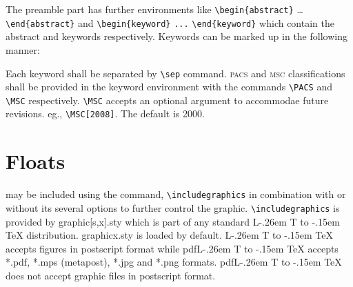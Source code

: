 \documentclass[a4paper,12pt]{article}
\makeatletter
\def\file#1{\textsf{#1}\xspace}
\def\LastPage{19}
\DeclareRobustCommand{\LaTeX}{L\kern-.26em%
        {\sbox\z@ T%
         \vbox to\ht\z@{\hbox{\check@mathfonts
           \fontsize\sf@size\z@
           \math@fontsfalse\selectfont
          A\,}%
         \vss}%
        }%
     \kern-.15em%
    \TeX}
\makeatother
\begin{document}
\begin{vquote}
\end{vquote}

The preamble part has further environments like
\verb+\begin{abstract}+ \dots \linebreak \verb+\end{abstract}+ and
\verb+\begin{keyword}+ \verb+...+ \verb+\end{keyword}+ which
contain the abstract and keywords respectively. Keywords can be
marked up in the following manner:


\noindent Each keyword shall be separated by \verb+\sep+ command.
\textsc{pacs} and \textsc{msc} classifications shall be provided in
the keyword environment with the commands \verb+\PACS+ and
\verb+\MSC+ respectively.  \verb+\MSC+ accepts an optional
argument to accommodae future revisions.
eg., \verb=\MSC[2008]=. The default is 2000.

\npskip=0mm
\pinclude{\copy\contbox\printSq{\LastPage}}

\newpage

\section{Floats}
\hypertarget{floats}{}
 may be included using the command,
\verb+\includegraphics+ in combination with or without its
several options to further control the graphic.
\verb+\includegraphics+ is provided by \file{graphic[s,x].sty}
which is part of any standard \LaTeX{} distribution.
\file{graphicx.sty} is loaded by default. \LaTeX{} accepts
figures in postscript format while pdf\LaTeX{} accepts
\file{*.pdf}, \file{*.mps} (metapost), \file{*.jpg} and
\file{*.png} formats.  pdf\LaTeX{} does not accept
graphic files in postscript format.
\end{document}
